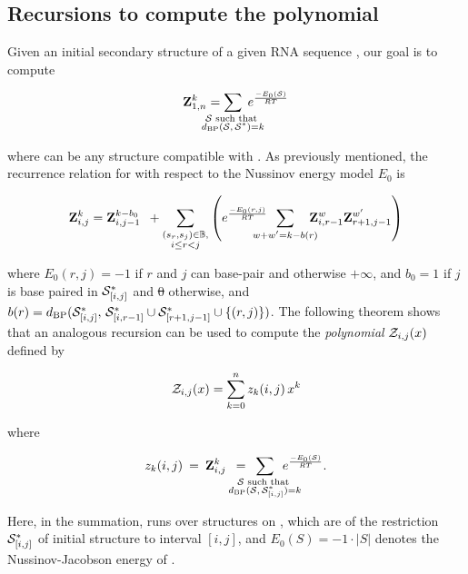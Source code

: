 \documentclass[11pt, oneside]{Thesis} %
\providecommand{\DIFadd}[1]{{\protect\color{blue}\uwave{#1}}} %
\providecommand{\DIFdel}[1]{{\protect\color{red}\sout{#1}}}                      %
\providecommand{\DIFaddbegin}{} %
\providecommand{\DIFaddend}{} %
\providecommand{\DIFdelbegin}{} %
\providecommand{\DIFdelend}{} %
\begin{document}
\subsection{Recursions to compute the polynomial
\texorpdfstring{}{}}
\label{subsec:fftbor:polynomial}

Given an initial secondary structure \strSt of a
given RNA sequence \seq, our goal is to compute

\begin{align}
\label{eq:fftbor:defZofK}
\bfZ{k}{1,n} = \sum_{\mathclap{\substack{\str \text{ such that }\\ \dBP{\str}{\strSt}=k}}}\;
\boltzNuss{\str}
\end{align}

where \str can be any structure compatible with \seq.
As previously mentioned, the recurrence relation for \rnabor
with respect to the Nussinov energy model $E_0$ is

\begin{align}
\label{eq:fftbor:rnaborNuss}
\bfZ{k}{i,j} = \bfZ{k-b_0}{i,j-1}\enspace +
\sum_{\substack{(s_r,s_j) \in \bpSet, \\ i \le r<j}}
\left(
\boltzNuss{r,j}\enspace \sum_{\mathclap{w+w'=k-b(r)}}\quad
\bfZ{w}{i,r-1} \bfZ{w'}{r+1,j-1}
\right)
\end{align}

where $E_0(r,j)=-1$ if $r$ and $j$ can base-pair and otherwise
$+\infty$, and
$b_0 = 1$ if $j$ is base paired in $\mathcal S^*_{[i,j]}$ and \DIFdelbegin \DIFdel{0 }\DIFdelend \DIFaddbegin \DIFadd{$0$ }\DIFaddend otherwise, and
$b(r)=d_{\text{BP}}(\mathcal S^*_{[i,j]},\,\mathcal S^*_{[i,r-1]} \cup \mathcal S^*_{[r+1,j-1]} \cup\{(r,j)\})$.
The following theorem shows that an analogous recursion can be used to compute
the {\em polynomial} ${\mathcal Z}_{i,j}(x)$ defined by

\begin{align}
\label{eq:fftbor:polynomialZij}
\emZ{i,j} = \sum_{k=0}^n z_k(i,j)\,x^k
\end{align}

where

\begin{align}
z_k(i,j)\>=\>
\bfZ{k}{i,j}\enspace=\enspace
\sum_{\mathclap{\substack{\str \text{ such that } \\
\dBP{\str}{\strSt_{[i,j]}}=k}}}\enspace
\boltzNuss{\str}.
\end{align}

Here, in the summation, \str runs over structures on \seqIJ, which
are \kNbrs of the restriction $\mathcal S^*_{[i,j]}$ of initial structure
\strSt to interval $[i,j]$, and
$E_0(S)=-1 \cdot |S|$ denotes the Nussinov-Jacobson energy of \str.
\end{document}
